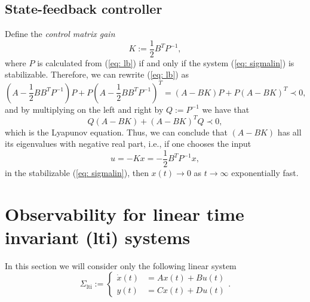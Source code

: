 \documentclass[11pt,a4paper,titlepage]{article}
\begin{document}
\subsection{State-feedback controller}
Define the \emph{control matrix gain}
\begin{equation}
	K:=\frac{1}{2}B^TP^{-1}, \label{eq: K}
\end{equation}
where $P$ is calculated from (\ref{eq: lb}) if and only if the system (\ref{eq: sigmalin}) is stabilizable. Therefore, we can rewrite (\ref{eq: lb}) as
\begin{equation}
	(A - \frac{1}{2}BB^TP^{-1})P + P(A - \frac{1}{2}BB^TP^{-1})^T = (A-BK)P+P(A-BK)^T \prec 0,
\end{equation}
and by multiplying on the left and right by $Q:=P^{-1}$ we have that
\begin{equation}
	Q(A-BK)+(A-BK)^TQ \prec 0,
\end{equation}
which is the Lyapunov equation. Thus, we can conclude that $(A-BK)$ has all its eigenvalues with negative real part, i.e., if one chooses the input 
\begin{equation}
	u = -Kx = -\frac{1}{2}B^TP^{-1}x, \label{eq: conK}
\end{equation}
in the stabilizable (\ref{eq: sigmalin}), then $x(t) \to 0$ as $t\to\infty$ exponentially fast.

\section{Observability for linear time invariant (lti) systems}
In this section we will consider only the following linear system
\begin{equation}
	\Sigma_{\text{lti}} := \begin{cases}
	\dot x(t) &= Ax(t) + Bu(t) \\
		y(t) &= Cx(t) + Du(t)
	\end{cases}.
\label{eq: sigmalinc}
\end{equation}
\end{document}
